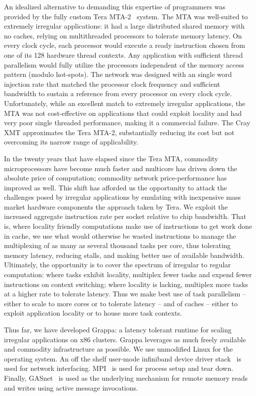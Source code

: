 An idealized alternative to demanding this expertise of programmers was provided by the fully custom Tera MTA-2~\cite{mta-2} system.  The MTA was well-suited to extremely irregular applications: it had a large distributed shared memory with no caches, relying on multithreaded processors to tolerate memory latency.  On every clock cycle, each processor would execute a ready instruction chosen from one of its 128 hardware thread contexts.  Any application with sufficient thread parallelism would fully utilize the processors independent of the memory access pattern (modulo hot-spots).  The network was designed with an single word injection rate that matched the processor clock frequency and sufficient bandwidth to sustain a reference from every processor on every clock cycle.  Unfortunately, while an excellent match to extremely irregular applications, the MTA was not cost-effective on applications that could exploit locality and had very poor single threaded performance, making it a commercial failure.  The Cray XMT approximates the Tera MTA-2, substantially reducing its cost but not overcoming its narrow range of applicability.

In the twenty years that have elapsed since the Tera MTA, commodity microprocessors have become much faster and multicore has driven down the absolute price of computation; commodity network price-performance has improved as well.  This shift has afforded us the opportunity to attack the challenges posed by irregular applications by emulating with inexpensive mass market hardware components the approach taken by Tera. We exploit the increased aggregate instruction rate per socket relative to chip bandwidth.  That is, where locality friendly computations make use of instructions to get work done in cache, we use what would otherwise be wasted instructions to manage the multiplexing of as many as several thousand tasks per core, thus tolerating memory latency, reducing stalls, and making better use of available bandwidth.  Ultimately, the opportunity is to cover the spectrum of irregular to regular computation:  where tasks exhibit locality, multiplex fewer tasks and expend fewer instructions on context switching; where locality is lacking, multiplex more tasks at a higher rate to tolerate latency.  Thus we make best use of task parallelism -- either to scale to more cores or to tolerate latency -- and of caches -- either to exploit application locality or to house more task contexts.

Thus far, we have developed Grappa:  a latency tolerant runtime for scaling irregular applications on x86 clusters.  Grappa leverages as much freely available and commodity infrastructure as possible. We use unmodified Linux for the operating system.  An off the shelf user-mode infiniband device driver stack~\cite{Melonox?} is used for network interfacing.  MPI~\cite{mpi} is used for process setup and tear down.  Finally, GASnet~\cite{gasnet} is used as the underlying mechanism for remote memory reads and writes using active message invocations.

